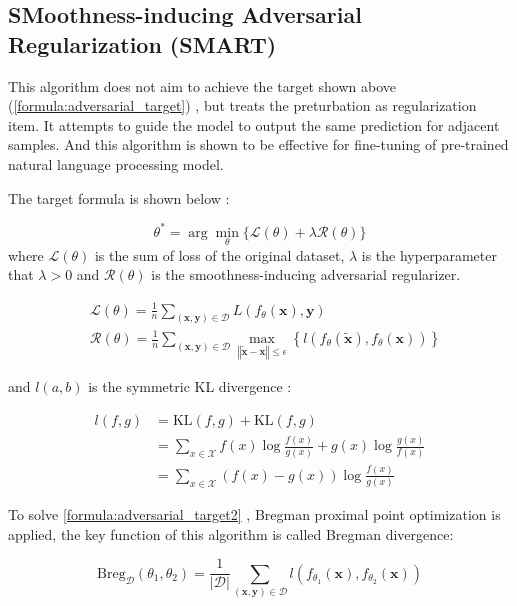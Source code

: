 \documentclass[10pt,twocolumn,letterpaper]{article}
\begin{document}
\subsection{SMoothness-inducing Adversarial Regularization (SMART)}

This algorithm does not aim to achieve the target shown above (\cref{formula:adversarial_target}) , but treats the preturbation as regularization item. It attempts to guide the model to output the same prediction for adjacent samples. And this algorithm is shown to be effective for fine-tuning of pre-trained natural language processing model.

The target formula is shown below :

\begin{equation}
  \theta^*=\arg\min_\theta\{\mathcal{L}(\theta)+\lambda \mathcal{R}(\theta)\}
  \tag{2:4:1}
  \label{formula:adversarial_target2}
\end{equation}
where $\mathcal{L}(\theta)$ is the sum of loss of the original dataset, $\lambda$ is the hyperparameter that $\lambda>0$ and $\mathcal{R}(\theta)$ is the smoothness-inducing adversarial regularizer.

$$
\begin{aligned}
  &\mathcal{L}(\theta)=\frac{1}{n}\sum_{(\mathbf{x}, \mathbf{y})\in\mathcal{D}} L(f_\theta(\mathbf{x}), \mathbf{y}) \\
  &\mathcal{R}(\theta)=\frac{1}{n}\sum_{(\mathbf{x}, \mathbf{y})\in\mathcal{D}} \max_{\left\Vert \tilde{\mathbf{x}}-\mathbf{x}\right\Vert\leq \epsilon}\left\{l\left(f_\theta(\tilde{\mathbf{x}}), f_\theta(\mathbf{x})\right)\right\}
\end{aligned}
$$

and $l(a, b)$ is the symmetric KL divergence :

$$
\begin{aligned}
l(f, g)&=\mathrm{KL}(f, g) + \mathrm{KL}(f, g) \\
&=\sum_{x\in \mathcal{X}} f(x)\log\frac{f(x)}{g(x)} + g(x)\log\frac{g(x)}{f(x)} \\
&=\sum_{x\in \mathcal{X}} (f(x) - g(x))\log\frac{f(x)}{g(x)}
\end{aligned}
$$

To solve \cref{formula:adversarial_target2} , Bregman proximal point optimization is applied, the key function of this algorithm is called Bregman divergence: 

$$
\mathrm{Breg}_\mathcal{D}(\theta_1, \theta_2)=\frac{1}{\left\vert\mathcal{D}\right\vert}
  \sum_{(\mathbf{x}, \mathbf{y})\in\mathcal{D}}l\left(f_{\theta_1}(\mathbf{x}), f_{\theta_2}(\mathbf{x})\right)
$$
\end{document}
